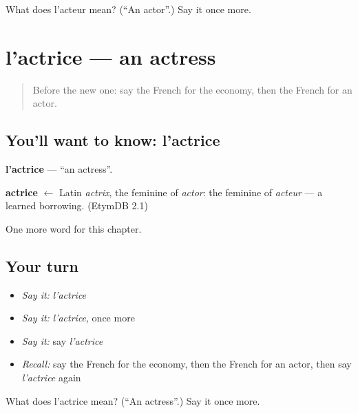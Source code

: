 \begin{tcolorbox}[breakable,colback=teal!4,colframe=teal!35!black,title={Before you move on}]
What does l'acteur mean? (\textquotedblleft{}An actor\textquotedblright{}.) Say it once more.
\end{tcolorbox}
\section[l'actrice]{l'actrice — an actress}

\label{lesson:FR-C249-actrice}



\begin{quote}
Before the new one: say the French for the economy, then the French for an actor.
\end{quote}

\subsection*{You'll want to know: l'actrice}
\textbf{l'actrice} — \textquotedblleft{}an actress\textquotedblright{}.

\begin{cousinweb}
\textbf{actrice} $\leftarrow$ Latin \emph{actrix}, the feminine of \emph{actor}: the feminine of \emph{acteur} — a learned borrowing. (EtymDB 2.1)
\end{cousinweb}

\begin{grammarlens}[title={What you've built}]
One more word for this chapter.
\end{grammarlens}

\subsection*{Your turn}
\begin{itemize}
\raggedright
  \item \emph{Say it:} \emph{l'actrice}
  \item \emph{Say it:} \emph{l'actrice}, once more
  \item \emph{Say it:} say \emph{l'actrice}
  \item \emph{Recall:} say the French for the economy, then the French for an actor, then say \emph{l'actrice} again
\end{itemize}

\begin{tcolorbox}[breakable,colback=teal!4,colframe=teal!35!black,title={Before you move on}]
What does l'actrice mean? (\textquotedblleft{}An actress\textquotedblright{}.) Say it once more.
\end{tcolorbox}
